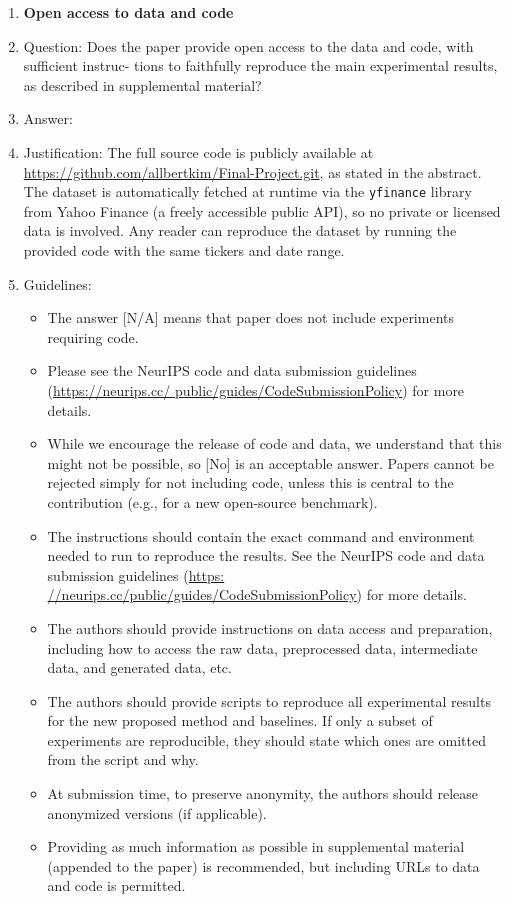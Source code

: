 \documentclass{article}
\begin{document}
\begin{enumerate}
\item {\bf Open access to data and code}
    \item[] Question: Does the paper provide open access to the data and code, with sufficient instruc-
tions to faithfully reproduce the main experimental results, as described in supplemental
material?
    \item[] Answer: \answerYes{}
    \item[] Justification: The full source code is publicly available at
    \url{https://github.com/allbertkim/Final-Project.git}, as stated in the abstract. The
    dataset is automatically fetched at runtime via the \texttt{yfinance} library from Yahoo
    Finance (a freely accessible public API), so no private or licensed data is involved. Any
    reader can reproduce the dataset by running the provided code with the same tickers and
    date range.
    \item[] Guidelines:
    \begin{itemize}
        \item The answer [N/A] means that paper does not include experiments requiring code.
        \item Please see the NeurIPS code and data submission guidelines (\url{https://neurips.cc/
public/guides/CodeSubmissionPolicy}) for more details.
        \item While we encourage the release of code and data, we understand that this might not
be possible, so [No] is an acceptable answer. Papers cannot be rejected simply for not
including code, unless this is central to the contribution (e.g., for a new open-source
benchmark).
        \item The instructions should contain the exact command and environment needed to run to
reproduce the results. See the NeurIPS code and data submission guidelines (\url{https:
//neurips.cc/public/guides/CodeSubmissionPolicy}) for more details.
        \item The authors should provide instructions on data access and preparation, including how
to access the raw data, preprocessed data, intermediate data, and generated data, etc.
        \item The authors should provide scripts to reproduce all experimental results for the new
proposed method and baselines. If only a subset of experiments are reproducible, they
should state which ones are omitted from the script and why.
        \item At submission time, to preserve anonymity, the authors should release anonymized
versions (if applicable).
        \item Providing as much information as possible in supplemental material (appended to the
paper) is recommended, but including URLs to data and code is permitted.
    \end{itemize}


\end{enumerate}
\end{document}
